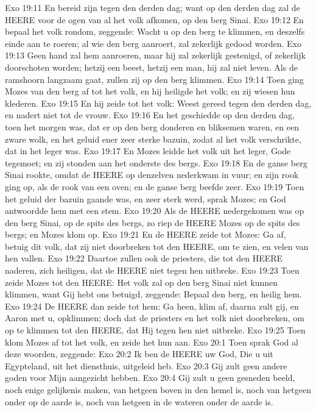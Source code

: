 Exo 19:11  En bereid zijn tegen den derden dag; want op den derden dag zal de HEERE voor de ogen van al het volk afkomen, op den berg Sinai.
Exo 19:12  En bepaal het volk rondom, zeggende: Wacht u op den berg te klimmen, en deszelfs einde aan te roeren; al wie den berg aanroert, zal zekerlijk gedood worden.
Exo 19:13  Geen hand zal hem aanroeren, maar hij zal zekerlijk gestenigd, of zekerlijk doorschoten worden; hetzij een beest, hetzij een man, hij zal niet leven. Als de ramshoorn langzaam gaat, zullen zij op den berg klimmen.
Exo 19:14  Toen ging Mozes van den berg af tot het volk, en hij heiligde het volk; en zij wiesen hun klederen.
Exo 19:15  En hij zeide tot het volk: Weest gereed tegen den derden dag, en nadert niet tot de vrouw.
Exo 19:16  En het geschiedde op den derden dag, toen het morgen was, dat er op den berg donderen en bliksemen waren, en een zware wolk, en het geluid ener zeer sterke bazuin, zodat al het volk verschrikte, dat in het leger was.
Exo 19:17  En Mozes leidde het volk uit het leger, Gode tegemoet; en zij stonden aan het onderste des bergs.
Exo 19:18  En de ganse berg Sinai rookte, omdat de HEERE op denzelven nederkwam in vuur; en zijn rook ging op, als de rook van een oven; en de ganse berg beefde zeer.
Exo 19:19  Toen het geluid der bazuin gaande was, en zeer sterk werd, sprak Mozes; en God antwoordde hem met een stem.
Exo 19:20  Als de HEERE nedergekomen was op den berg Sinai, op de spits des bergs, zo riep de HEERE Mozes op de spits des bergs; en Mozes klom op.
Exo 19:21  En de HEERE zeide tot Mozes: Ga af, betuig dit volk, dat zij niet doorbreken tot den HEERE, om te zien, en velen van hen vallen.
Exo 19:22  Daartoe zullen ook de priesters, die tot den HEERE naderen, zich heiligen, dat de HEERE niet tegen hen uitbreke.
Exo 19:23  Toen zeide Mozes tot den HEERE: Het volk zal op den berg Sinai niet kunnen klimmen, want Gij hebt ons betuigd, zeggende: Bepaal den berg, en heilig hem.
Exo 19:24  De HEERE dan zeide tot hem: Ga heen, klim af, daarna zult gij, en Aaron met u, opklimmen; doch dat de priesters en het volk niet doorbreken, om op te klimmen tot den HEERE, dat Hij tegen hen niet uitbreke.
Exo 19:25  Toen klom Mozes af tot het volk, en zeide het hun aan.
Exo 20:1  Toen sprak God al deze woorden, zeggende:
Exo 20:2  Ik ben de HEERE uw God, Die u uit Egypteland, uit het diensthuis, uitgeleid heb.
Exo 20:3  Gij zult geen andere goden voor Mijn aangezicht hebben.
Exo 20:4  Gij zult u geen gesneden beeld, noch enige gelijkenis maken, van hetgeen boven in den hemel is, noch van hetgeen onder op de aarde is, noch van hetgeen in de wateren onder de aarde is.
